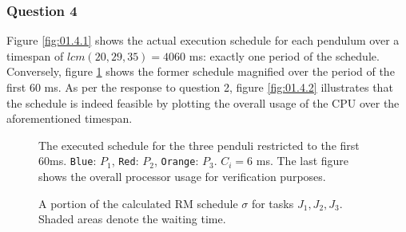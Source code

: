 \subsubsection{Question 4}

Figure \ref{fig:01.4.1} shows the actual execution schedule for each pendulum
over a timespan of $lcm(20,29,35) = 4060$ ms: exactly one period of the schedule.
Conversely, figure \ref{fig:01.4.1.small} shows the former schedule magnified
over the period of the first 60 ms.
As per the response to question 2, figure \ref{fig:01.4.2} illustrates that the
schedule is indeed feasible by plotting the overall usage of the CPU over the
aforementioned timespan.

\begin{sidewaysfigure}
  \begin{figure}[H]\centering
    \scalebox{1}{}
    \caption{The executed schedule for the three penduli restricted to the first
      60ms. \texttt{Blue}: $P_1$, \texttt{Red}: $P_2$,
      \texttt{Orange}: $P_3$. $C_i = 6$ ms. The last figure shows the overall
      processor usage for verification purposes.}
    \label{fig:01.4.1.small}
  \end{figure}

  \begin{figure}[H]\centering
    \scalebox{0.7}{}
    \caption{A portion of the calculated RM schedule $\sigma$ for tasks
      $J_1, J_2, J_3$.  Shaded areas denote the waiting time.}
    \label{fig:rm_6}
  \end{figure}
\end{sidewaysfigure}

\noindent{}
